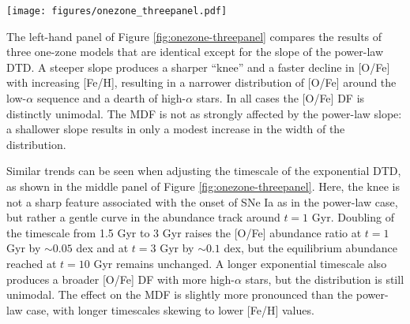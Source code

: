 \documentclass[twocolumn,twocolappendix,linenumbers]{aastex631}
\begin{document}
\begin{figure*}
    \centering
    \texttt{[image: figures/onezone\_threepanel.pdf]}
    \caption{Abundance tracks in the [O/Fe]--[Fe/H] plane for one-zone chemical evolution models (see discussion in Section \ref{sec:onezone-results}) which assume the various DTD shapes (see Figure \ref{fig:dtds}). The open symbols along each curve mark logarithmic steps in time. The top and right-hand marginal panels present the distribution functions (DFs) of [Fe/H] and [O/Fe], respectively. For display purposes, these distributions are convolved with a Gaussian kernel with a standard deviation of 0.02 dex. 
    \textit{Left:} A power-law DTD with varying slope $\alpha$. For reference, the solid gray curve represents an exponential DTD with $\tau=3$ Gyr. 
    \textit{Center:} An exponential DTD with varying timescale $\tau$. 
    \textit{Right:} A plateau DTD with varying width $W$. All assume a post-plateau slope of $\alpha=-1.1$. For reference, the solid gray curve represents an exponential DTD with $\tau=3$ Gyr, and the dotted purple curve represents a power-law DTD with $\alpha=-1.1$ and no plateau.}
    \label{fig:onezone-threepanel}
\end{figure*}

The left-hand panel of Figure \ref{fig:onezone-threepanel} compares the results of three one-zone models that are identical except for the slope of the power-law DTD. A steeper slope produces a sharper ``knee'' and a faster decline in [O/Fe] with increasing [Fe/H], resulting in a narrower distribution of [O/Fe] around the low-$\alpha$ sequence and a dearth of high-$\alpha$ stars. In all cases the [O/Fe] DF is distinctly unimodal. The MDF is not as strongly affected by the power-law slope: a shallower slope results in only a modest increase in the width of the distribution.

Similar trends can be seen when adjusting the timescale of the exponential DTD, as shown in the middle panel of Figure \ref{fig:onezone-threepanel}. Here, the knee is not a sharp feature associated with the onset of SNe Ia as in the power-law case, but rather a gentle curve in the abundance track around $t=1$ Gyr. Doubling of the timescale from 1.5 Gyr to 3 Gyr raises the [O/Fe] abundance ratio at $t=1$ Gyr by $\sim0.05$ dex and at $t=3$ Gyr by $\sim0.1$ dex, but the equilibrium abundance reached at $t=10$ Gyr remains unchanged. A longer exponential timescale also produces a broader [O/Fe] DF with more high-$\alpha$ stars, but the distribution is still unimodal.
The effect on the MDF is slightly more pronounced than the power-law case, with longer timescales skewing to lower [Fe/H] values.
\end{document}
